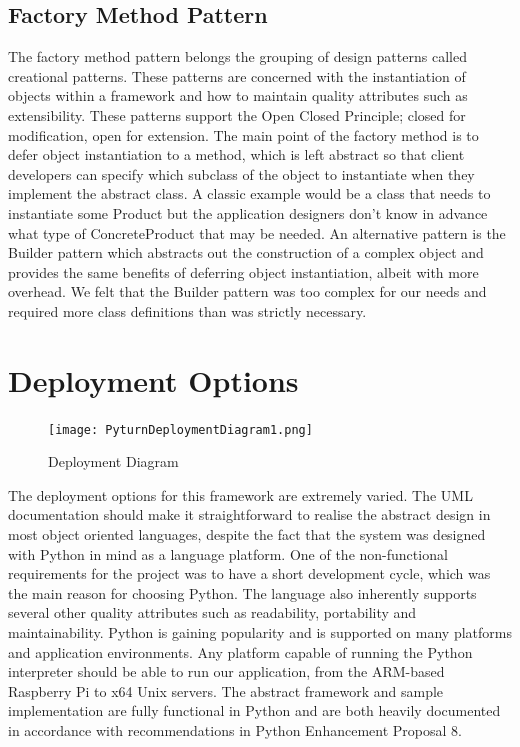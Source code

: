 \documentclass[11pt]{report}
\begin{document}
	\subsection{Factory Method Pattern}
	The factory method pattern belongs the grouping of design patterns called creational patterns. These patterns are concerned with the instantiation of objects within a framework and how to maintain quality attributes such as extensibility. These patterns support the Open Closed Principle; closed for modification, open for extension. The main point of the factory method is to defer object instantiation to a method, which is left abstract so that client developers can specify which subclass of the object to instantiate when they implement the abstract class. A classic example would be a class that needs to instantiate some Product but the application designers don't know in advance what type of ConcreteProduct that may be needed. An alternative pattern is the Builder pattern which abstracts out the construction of a complex object and provides the same benefits of deferring object instantiation, albeit with more overhead. We felt that the Builder pattern was too complex for our needs and required more class definitions than was strictly necessary. 
	
\section{Deployment Options}
\begin{figure}[htp]
\centering
\texttt{[image: PyturnDeploymentDiagram1.png]}
\caption{Deployment Diagram}
\label{Deployment Diagram}
\end{figure}
The deployment options for this framework are extremely varied. The UML documentation should make it straightforward to realise the abstract design in most object oriented languages, despite the fact that the system was designed with Python in mind as a language platform. One of the non-functional requirements for the project was to have a short development cycle, which was the main reason for choosing Python. The language also inherently supports several other quality attributes such as readability, portability and maintainability. Python is gaining popularity and is supported on many platforms and application environments. Any platform capable of running the Python interpreter should be able to run our application, from the ARM-based Raspberry Pi to x64 Unix servers. The abstract framework and sample implementation are fully functional in Python and are both heavily documented in accordance with recommendations in Python Enhancement Proposal 8. 
\end{document}
